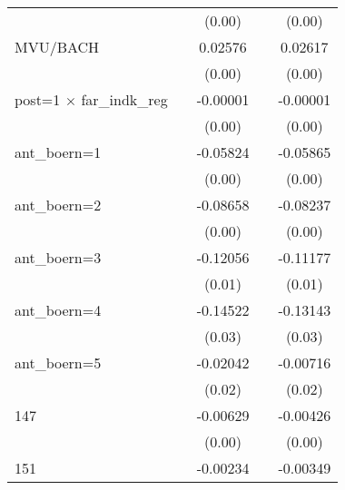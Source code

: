 \begin{table}[htbp]
\begin{tabular}{l*{4}{c}}
                    &                     &      (0.00)         &                     &      (0.00)         \\
MVU/BACH            &                     &     0.02576\sym{***}&                     &     0.02617\sym{***}\\
                    &                     &      (0.00)         &                     &      (0.00)         \\
post=1 $\times$ far\_indk\_reg&                     &    -0.00001\sym{**} &                     &    -0.00001\sym{**} \\
                    &                     &      (0.00)         &                     &      (0.00)         \\
ant\_boern=1         &                     &    -0.05824\sym{***}&                     &    -0.05865\sym{***}\\
                    &                     &      (0.00)         &                     &      (0.00)         \\
ant\_boern=2         &                     &    -0.08658\sym{***}&                     &    -0.08237\sym{***}\\
                    &                     &      (0.00)         &                     &      (0.00)         \\
ant\_boern=3         &                     &    -0.12056\sym{***}&                     &    -0.11177\sym{***}\\
                    &                     &      (0.01)         &                     &      (0.01)         \\
ant\_boern=4         &                     &    -0.14522\sym{***}&                     &    -0.13143\sym{***}\\
                    &                     &      (0.03)         &                     &      (0.03)         \\
ant\_boern=5         &                     &    -0.02042         &                     &    -0.00716         \\
                    &                     &      (0.02)         &                     &      (0.02)         \\
147                 &                     &    -0.00629         &                     &    -0.00426         \\
                    &                     &      (0.00)         &                     &      (0.00)         \\
151                 &                     &    -0.00234         &                     &    -0.00349         \\

\end{tabular}
\end{table}
